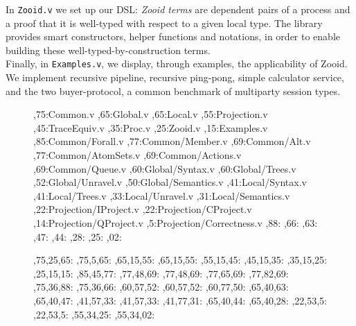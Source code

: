 \documentclass[11pt, a4paper,UKenglish,cleveref, autoref, thm-restate]{article}
\begin{document}
In \texttt{Zooid.v} we set up our DSL: \emph{Zooid terms} are dependent pairs of a process and a proof that it is well-typed with respect to a given local type. The library provides smart constructors, helper functions and notations, in order to enable building these well-typed-by-construction terms.\\

Finally, in \texttt{Examples.v}, we display, through examples, the applicability of Zooid. We implement recursive pipeline, recursive ping-pong, simple calculator service, and  the two buyer-protocol, a common benchmark of multiparty session types.



\setcounter{diagheight}{90}


\begin{figure}
\begin{chart}%

,75:{}{Common.v}{}
,65:{}{Global.v}{}
,65:{}{Local.v}{}
,55:{}{Projection.v}{}
,45:{}{TraceEquiv.v}{}
,35:{}{Proc.v}{}
,25:{}{Zooid.v}{}
,15:{}{Examples.v}{}
,85:{}{Common/Forall.v}{}
,77:{}{Common/Member.v}{}
,69:{}{Common/Alt.v}{}
,77:{}{Common/AtomSets.v}{}
,69:{}{Common/Actions.v}{}
,69:{}{Common/Queue.v}{}
,60:{}{Global/Syntax.v}{}
,60:{}{Global/Trees.v}{}
,52:{}{Global/Unravel.v}{}
,50:{}{Global/Semantics.v}{}
,41:{}{Local/Syntax.v}{}
,41:{}{Local/Trees.v}{}
,33:{}{Local/Unravel.v}{}
,31:{}{Local/Semantics.v}{}
,22:{}{Projection/IProject.v}{}
,22:{}{Projection/CProject.v}{}
,14:{}{Projection/QProject.v}{}
,5:{}{Projection/Correctness.v}{}
,88:{}
,66:{}
,63:{}
,47:{}
,44:{}
,28:{}
,25:{}
,02:{}

,75,25,65:
,75,5,65:
,65,15,55:
,65,15,55:
,55,15,45:
,45,15,35:
,35,15,25:
,25,15,15:
,85,45,77:
,77,48,69:
,77,48,69:
,77,65,69:
,77,82,69:
,75,36,88:
,75,36,66:
,60,57,52:
,60,57,52:
,60,77,50:
,65,40,63:
,65,40,47:
,41,57,33:
,41,57,33:
,41,77,31:
,65,40,44:
,65,40,28:
,22,53,5:
,22,53,5:
,55,34,25:
,55,34,02:


\end{chart}
\end{figure}
\end{document}
